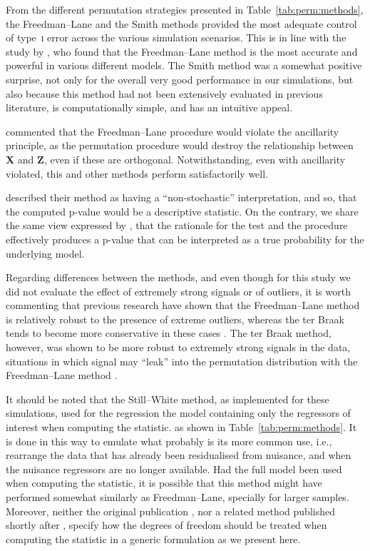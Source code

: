 From the different permutation strategies presented in Table~\ref{tab:perm:methods}, the Freedman--Lane and the Smith methods provided the most adequate control of type~\textsc{i} error across the various simulation scenarios. This is in line with the study by \citet{Anderson1999}, who found that the Freedman--Lane method is the most accurate and powerful in various different models. The Smith method was a somewhat positive surprise, not only for the overall very good performance in our simulations, but also because this method had not been extensively evaluated in previous literature, is computationally simple, and has an intuitive appeal.

\citet{Welch1990} commented that the Freedman--Lane procedure would violate the ancillarity principle, as the permutation procedure would destroy the relationship between $\mathbf{X}$ and $\mathbf{Z}$, even if these are orthogonal. Notwithstanding, even with ancillarity violated, this and other methods perform satisfactorily well.

\citet{Freedman1983} described their method as having a ``non-stochastic'' interpretation, and so, that the computed p-value would be a descriptive statistic. On the contrary, we share the same view expressed by \citet{Anderson1999}, that the rationale for the test and the procedure effectively produces a p-value that can be interpreted as a true probability for the underlying model.

Regarding differences between the methods, and even though for this study we did not evaluate the effect of extremely strong signals or of outliers, it is worth commenting that previous research have shown that the Freedman--Lane method is relatively robust to the presence of extreme outliers, whereas the ter Braak tends to become more conservative in these cases \citep{Anderson1999}. The ter Braak method, however, was shown to be more robust to extremely strong signals in the data, situations in which signal may ``leak'' into the permutation distribution with the Freedman--Lane method \citep{Salimi-Khorshidi2011}.

It should be noted that the Still--White method, as implemented for these simulations, used for the regression the model containing only the regressors of interest when computing the statistic. as shown in Table~\ref{tab:perm:methods}. It is done in this way to emulate what probably is its more common use, i.e., rearrange the data that has already been residualised from nuisance, and when the nuisance regressors are no longer available. Had the full model been used when computing the statistic, it is possible that this method might have performed somewhat similarly as Freedman--Lane, specially for larger samples. Moreover, neither the original publication \citep{Still1981}, nor a related method published shortly after \citep{Levin1983}, specify how the degrees of freedom should be treated when computing the statistic in a generic formulation as we present here.

